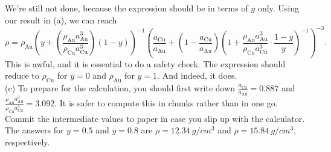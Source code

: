 \documentclass[../TST.tex]{subfiles}
\begin{document}
\begin{solution}
\begin{equation*}
\end{equation*}
We're still not done, because the expression should be in terms of $y$ only. Using our result in (a), we can reach
\begin{equation*}
\boxed{	\rho=\rho_\mathrm{Au}\left(y+\left(\frac{\rho_\mathrm{Au}a_\mathrm{Au}^3}{\rho_\mathrm{Cu}a_\mathrm{Cu}^3}\right) (1-y)\right)^{-1}\left(\frac{a_\mathrm{Cu}}{a_\mathrm{Au}}+ \left(1-\frac{a_\mathrm{Cu}}{a_\mathrm{Au}}\right)\left(1+\frac{\rho_\mathrm{Au}a_\mathrm{Au}^3}{\rho_\mathrm{Cu}a_\mathrm{Cu}^3}\cdot \frac{1-y}{y}\right)^{-1}  \right)^{-3}
.}
\end{equation*}
This is awful, and it is essential to do a safety check. The expression should reduce to $\rho_\mathrm{Cu}$ for $y=0$ and $\rho_\mathrm{Au}$ for $y=1$. And indeed, it does.\\

(c) To prepare for the calculation, you should first write down $\frac{a_\mathrm{Cu}}{a_\mathrm{Au}}=0.887$ and $\frac{\rho_\mathrm{Au}a_\mathrm{Au}^3}{\rho_\mathrm{Cu}a_\mathrm{Cu}^3}=3.092$. It is safer to compute this in chunks rather than in one go. Commit the intermediate values to paper in case you slip up with the calculator. The answers for $y=0.5$ and $y=0.8$ are $\boxed{\rho=\qty{12.34}{g/cm^3}}$ and $\boxed{\rho=\qty{15.84}{g/cm^3}}$, respectively.



\end{solution}
\fi
\end{document}
